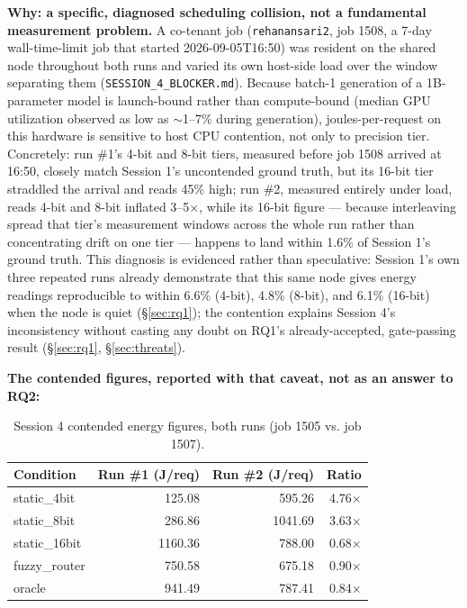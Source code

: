 \documentclass[conference]{IEEEtran}
\begin{document}
\textbf{Why: a specific, diagnosed scheduling collision, not a
fundamental measurement problem.} A co-tenant job (\texttt{rehanansari2},
job 1508, a 7-day wall-time-limit job that started
2026-09-05T16:50) was resident on the shared node throughout both runs
and varied its own host-side load over the window separating them
(\texttt{SESSION\_4\_BLOCKER.md}). Because batch-1 generation of a
1B-parameter model is launch-bound rather than compute-bound (median GPU
utilization observed as low as $\sim$1--7\% during generation),
joules-per-request on this hardware is sensitive to host CPU contention,
not only to precision tier. Concretely: run \#1's 4-bit and 8-bit tiers,
measured before job 1508 arrived at 16:50, closely match Session 1's
uncontended ground truth, but its 16-bit tier straddled the arrival and
reads 45\% high; run \#2, measured entirely under load, reads 4-bit and
8-bit inflated 3--5$\times$, while its 16-bit figure --- because
interleaving spread that tier's measurement windows across the whole run
rather than concentrating drift on one tier --- happens to land within
1.6\% of Session 1's ground truth. This diagnosis is evidenced rather
than speculative: Session 1's own three repeated runs already demonstrate
that this same node gives energy readings reproducible to within 6.6\%
(4-bit), 4.8\% (8-bit), and 6.1\% (16-bit) when the node is quiet
(\S\ref{sec:rq1}); the contention explains Session 4's inconsistency
without casting any doubt on RQ1's already-accepted, gate-passing result
(\S\ref{sec:rq1}, \S\ref{sec:threats}).

\textbf{The contended figures, reported with that caveat, not as an
answer to RQ2:}

\begin{table}[h]
\caption{Session 4 contended energy figures, both runs (job 1505 vs. job 1507).}
\label{tab:session4}
\centering
\begin{tabular}{@{}lrrr@{}}
\toprule
Condition & Run \#1 (J/req) & Run \#2 (J/req) & Ratio \\
\midrule
static\_4bit  & 125.08 & 595.26 & 4.76$\times$ \\
static\_8bit  & 286.86 & 1041.69 & 3.63$\times$ \\
static\_16bit & 1160.36 & 788.00 & 0.68$\times$ \\
fuzzy\_router & 750.58 & 675.18 & 0.90$\times$ \\
oracle        & 941.49 & 787.41 & 0.84$\times$ \\
\bottomrule
\end{tabular}
\end{table}
\end{document}

